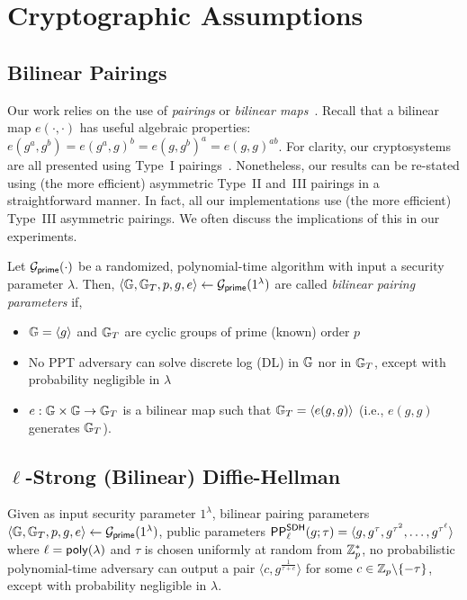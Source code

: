 \section{Cryptographic Assumptions}
\label{s:prelim:assumptions}

\subsection{Bilinear Pairings}
\label{s:prelim:pairings}

Our work relies on the use of \emph{pairings} or \emph{bilinear maps}~\cite{MVO91,Joux00}.
Recall that a bilinear map $e(\cdot,\cdot)$ has useful algebraic properties: $e(g^a, g^b) = e(g^a, g)^b = e(g, g^b)^a = e(g, g)^{ab}$. 
For clarity, our cryptosystems are all presented using Type~I pairings~\cite{GPS08}.
Nonetheless, our results can be re-stated using (the more efficient) asymmetric Type~II and~III pairings in a straightforward manner.
In fact, all our implementations use (the more efficient) Type~III asymmetric pairings.
We often discuss the implications of this in our experiments.

\begin{definition}
\label{def:bilinear-pairing-parameters}
Let $\mathcal{G}_{\mathsf{prime}}(\cdot)$ be a randomized, polynomial-time algorithm with input a security parameter $\lambda$.
Then, $\langle \mathbb{G}, \mathbb{G}_T, p, g, e\rangle \leftarrow \mathcal{G}_{\mathsf{prime}}(1^\lambda)$ are called \textit{bilinear pairing parameters} if,
\begin{itemize}
\item $\mathbb{G}=\langle g\rangle$ and $\mathbb{G}_T$ are cyclic groups of prime (known) order $p$
\item No PPT adversary can solve discrete log (DL) in $\mathbb{G}$ nor in $\mathbb{G}_T$, except with probability negligible in $\lambda$
\item $e : \mathbb{G}\times \mathbb{G} \rightarrow \mathbb{G}_T$ is a bilinear map such that $\mathbb{G}_T = \langle e(g,g) \rangle$ (i.e., $e(g,g)$ generates $\mathbb{G}_T$).
\end{itemize}
\end{definition}

\subsection{$\ell$-Strong (Bilinear) Diffie-Hellman}
\label{s:prelim:sbdh}

\begin{definition}
\label{def:q-sdh}
Given as input security parameter $1^\lambda$, bilinear pairing parameters $\langle \mathbb{G}, \mathbb{G}_T, p, g, e\rangle \leftarrow \mathcal{G}_{\mathsf{prime}}(1^\lambda)$,
public parameters  $\mathsf{PP}^\mathsf{SDH}_\ell(g;\tau)=\langle g, g^\tau, g^{\tau^2}, \dots, g^{\tau^\ell}\rangle$ where $\ell = \mathsf{poly}(\lambda)$ and $\tau$ is chosen uniformly at random from $\mathbb{Z}_p^*$, no probabilistic polynomial-time adversary can output a pair $\langle c, g^\frac{1}{\tau+c}\rangle$ for some $c \in \mathbb{Z}_p \backslash \{-\tau\}$, except with probability negligible in $\lambda$.
\end{definition}


